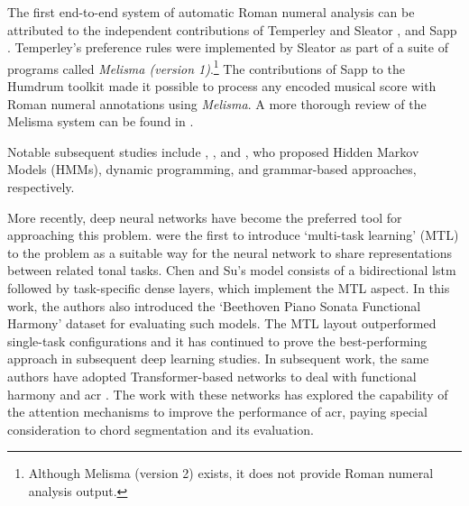 

The first end-to-end system of automatic Roman numeral
analysis can be attributed to the independent contributions
of Temperley and Sleator \parencite{temperley2004cognition},
and Sapp \parencite{sapp2009tsroot}. Temperley's preference
rules were implemented by Sleator as part of a suite of
programs called \emph{Melisma (version
1)}.\footnote{Although Melisma (version 2) exists, it does
not provide Roman numeral analysis output.} The
contributions of Sapp to the Humdrum toolkit
\parencite{huron2002music} made it possible to process any
encoded musical score with Roman numeral annotations using
\emph{Melisma}. A more thorough review of the Melisma system
can be found in \textcite{napoleslopez2017automatic}.

Notable subsequent studies include
\textcite{raphael2004functional},
\textcite{illescas2007harmonic}, and
\textcite{magalhaes2011functional}, who proposed Hidden
Markov Models (HMMs), dynamic programming, and grammar-based
approaches, respectively.

More recently, deep neural networks have become the
preferred tool for approaching this problem.
\textcite{chen2018functional} were the first to introduce
`multi-task learning' (MTL) \parencite{ruder2017overview} to
the problem as a suitable way for the neural network to
share representations between related tonal tasks. Chen and
Su's model consists of a bidirectional \gls{lstm}
\parencite{hochreiter1997long} followed by task-specific
dense layers, which implement the MTL aspect. In this work,
the authors also introduced the `Beethoven Piano Sonata
Functional Harmony' dataset for evaluating such models. The
MTL layout outperformed single-task configurations and it
has continued to prove the best-performing approach in
subsequent deep learning studies. In subsequent work, the
same authors have adopted Transformer-based networks to deal
with functional harmony and \gls{acr}
\parencite{chen2019harmony, chen2021attend}. The work with
these networks has explored the capability of the attention
mechanisms to improve the performance of \gls{acr}, paying
special consideration to chord segmentation and its
evaluation.

